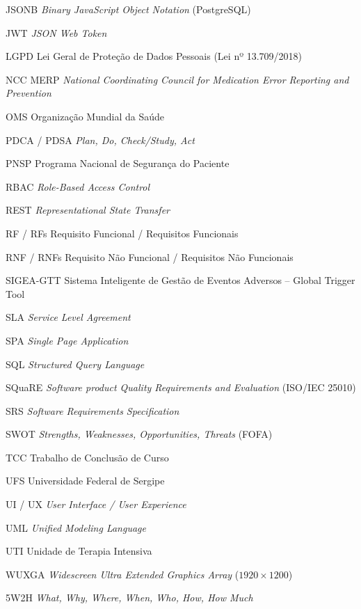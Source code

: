 \begin{siglas}
  \item[JSONB] \textit{Binary JavaScript Object Notation} (PostgreSQL)
  \item[JWT] \textit{JSON Web Token}
  \item[LGPD] Lei Geral de Proteção de Dados Pessoais (Lei nº 13.709/2018)
  \item[NCC MERP] \textit{National Coordinating Council for Medication Error Reporting and Prevention}
  \item[OMS] Organização Mundial da Saúde
  \item[PDCA / PDSA] \textit{Plan, Do, Check/Study, Act}
  \item[PNSP] Programa Nacional de Segurança do Paciente
  \item[RBAC] \textit{Role-Based Access Control}
  \item[REST] \textit{Representational State Transfer}
  \item[RF / RFs] Requisito Funcional / Requisitos Funcionais
  \item[RNF / RNFs] Requisito Não Funcional / Requisitos Não Funcionais
  \item[SIGEA-GTT] Sistema Inteligente de Gestão de Eventos Adversos – Global Trigger Tool
  \item[SLA] \textit{Service Level Agreement}
  \item[SPA] \textit{Single Page Application}
  \item[SQL] \textit{Structured Query Language}
  \item[SQuaRE] \textit{Software product Quality Requirements and Evaluation} (ISO/IEC 25010)
  \item[SRS] \textit{Software Requirements Specification}
  \item[SWOT] \textit{Strengths, Weaknesses, Opportunities, Threats} (FOFA)
  \item[TCC] Trabalho de Conclusão de Curso
  \item[UFS] Universidade Federal de Sergipe
  \item[UI / UX] \textit{User Interface / User Experience}
  \item[UML] \textit{Unified Modeling Language}
  \item[UTI] Unidade de Terapia Intensiva
  \item[WUXGA] \textit{Widescreen Ultra Extended Graphics Array} ($1920 \times 1200$)
  \item[5W2H] \textit{What, Why, Where, When, Who, How, How Much}
\end{siglas}

